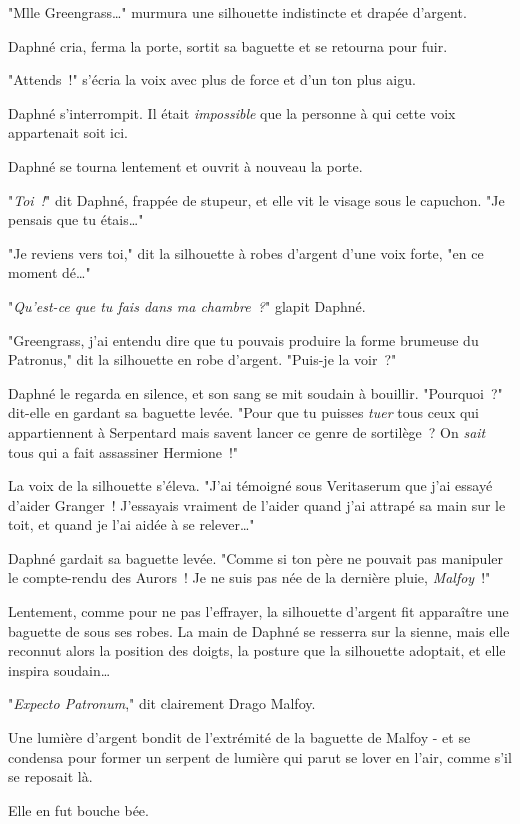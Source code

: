 "Mlle Greengrass…" murmura une silhouette indistincte et drapée d'argent.

Daphné cria, ferma la porte, sortit sa baguette et se retourna pour fuir.

"Attends~!" s'écria la voix avec plus de force et d'un ton plus aigu.

Daphné s'interrompit. Il était \emph{impossible} que la personne à qui cette voix appartenait soit ici.

Daphné se tourna lentement et ouvrit à nouveau la porte.

"\emph{Toi~!}" dit Daphné, frappée de stupeur, et elle vit le visage sous le capuchon. "Je pensais que tu étais…"

"Je reviens vers toi," dit la silhouette à robes d'argent d'une voix forte, "en ce moment dé…"

"\emph{Qu'est-ce que tu fais dans ma chambre~?}" glapit Daphné.

"Greengrass, j'ai entendu dire que tu pouvais produire la forme brumeuse du Patronus," dit la silhouette en robe d'argent. "Puis-je la voir~?"

Daphné le regarda en silence, et son sang se mit soudain à bouillir. "Pourquoi~?" dit-elle en gardant sa baguette levée. "Pour que tu puisses \emph{tuer} tous ceux qui appartiennent à Serpentard mais savent lancer ce genre de sortilège~? On \emph{sait} tous qui a fait assassiner Hermione~!"

La voix de la silhouette s'éleva. "J'ai témoigné sous Veritaserum que j'ai essayé d'aider Granger~! J'essayais vraiment de l'aider quand j'ai attrapé sa main sur le toit, et quand je l'ai aidée à se relever…"

Daphné gardait sa baguette levée. "Comme si ton père ne pouvait pas manipuler le compte-rendu des Aurors~! Je ne suis pas née de la dernière pluie, \emph{Malfoy}~!"

Lentement, comme pour ne pas l'effrayer, la silhouette d'argent fit apparaître une baguette de sous ses robes. La main de Daphné se resserra sur la sienne, mais elle reconnut alors la position des doigts, la posture que la silhouette adoptait, et elle inspira soudain…

"\emph{Expecto Patronum}," dit clairement Drago Malfoy.

Une lumière d'argent bondit de l'extrémité de la baguette de Malfoy - et se condensa pour former un serpent de lumière qui parut se lover en l'air, comme s'il se reposait là.

Elle en fut bouche bée.

